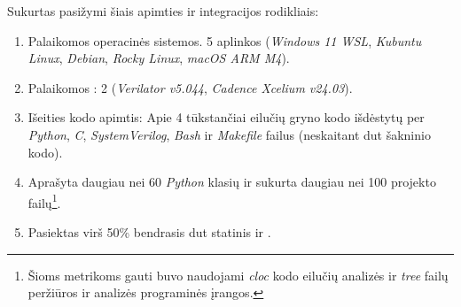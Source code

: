 Sukurtas   pasižymi šiais apimties ir integracijos rodikliais:
\begin{enumerate}
	\item Palaikomos operacinės sistemos. 5 aplinkos (\textit{Windows 11 WSL}, \textit{Kubuntu Linux}, \textit{Debian}, \textit{Rocky Linux}, \textit{macOS ARM M4}).
	\item Palaikomos : 2 (\textit{Verilator v5.044}, \textit{Cadence Xcelium v24.03}).
	\item Išeities kodo apimtis: Apie 4 tūkstančiai eilučių gryno kodo išdėstytų per \textit{Python}, \textit{C}, \textit{SystemVerilog}, \textit{Bash} ir \textit{Makefile} failus (neskaitant \gls{dut} šakninio kodo).
	\item Aprašyta daugiau nei 60 \textit{Python} klasių ir sukurta daugiau nei 100 projekto failų\footnote{Šioms metrikoms gauti buvo naudojami \textit{cloc} kodo eilučių analizės ir \textit{tree} failų peržiūros ir analizės programinės įrangos.}.
	\item Pasiektas virš 50\% bendrasis \gls{dut} statinis ir .
\end{enumerate}